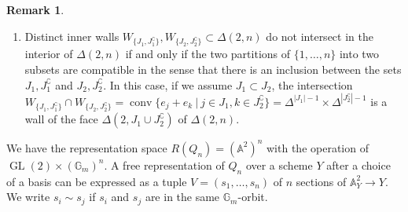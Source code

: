 \documentclass[10pt,a4paper]{amsart}
\theoremstyle{definition}
\newtheorem{rema}[theo]{Remark}
\def\A{\mathds A}
\def\G{\mathds G}
\DeclareMathOperator{\GL}{GL}
\DeclareMathOperator{\conv}{conv}
\begin{document}
\begin{rema}
\begin{enumerate}[label=(\arabic*)]
\item\label{rema2.2_4} %
Distinct inner walls $W_{\{J_1,J_1^\complement\}},W_{\{J_2,J_2^\complement\}}
\subset\Delta(2,n)$ do not intersect in the interior of $\Delta(2,n)$ 
if and only if the two partitions of $\{1,\ldots,n\}$ into two subsets 
are compatible in the sense that there is an inclusion between the sets
$J_1,J_1^\complement$ and $J_2,J_2^\complement$.
In this case, if we assume $J_1\subset J_2$, the intersection
$W_{\{J_1,J_1^\complement\}}\cap W_{\{J_2,J_2^\complement\}}
=\conv\{e_j+e_k\:|\:j\in J_1,k\in J_2^\complement\}
=\Delta^{|J_1|-1}\times\Delta^{|J_2^\complement|-1}$
is a wall of the face $\Delta(2,J_1\cup J_2^\complement)$
of $\Delta(2,n)$.
\end{enumerate}
\end{rema}

We have the representation space $R(Q_n)=(\A^2)^n$ with the operation of 
$\GL(2)\times(\G_m)^n$. A free representation of $Q_n$ over a scheme $Y$ 
after a choice of a basis can be expressed as a tuple $V=(s_1,\ldots,s_n)$ 
of $n$ sections of $\A^2_Y\to Y$. 
We write $s_i\sim s_j$ if $s_i$ and $s_j$ are in the same $\G_m$-orbit.
\end{document}
